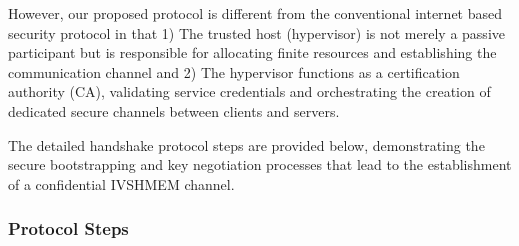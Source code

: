\documentclass[conference]{IEEEtran}
\begin{document}
However, our proposed protocol is different from the conventional internet based security protocol in that 1) The trusted host (hypervisor) is not merely a passive participant but is responsible for allocating finite resources and establishing the communication channel  and 2) The hypervisor functions as a certification authority (CA), validating service credentials and orchestrating the creation of dedicated secure channels between clients and servers. 

The detailed handshake protocol steps are provided below, demonstrating the secure bootstrapping and key negotiation processes that lead to the establishment of a confidential IVSHMEM channel.






\subsubsection{Protocol Steps}
\end{document}
